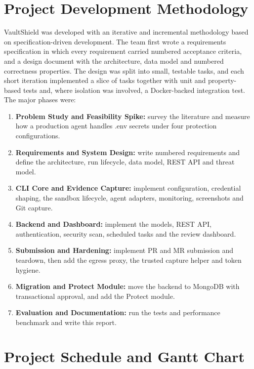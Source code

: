 \documentclass[12pt,a4paper,oneside]{report}
\providecommand{\tightlist}{\setlength{\itemsep}{0pt}\setlength{\parskip}{0pt}}
\begin{document}
\section{Project Development Methodology}\label{project-development-methodology}

VaultShield was developed with an iterative and incremental methodology based on specification-driven development. The team first wrote a requirements specification in which every requirement carried numbered acceptance criteria, and a design document with the architecture, data model and numbered correctness properties. The design was split into small, testable tasks, and each short iteration implemented a slice of tasks together with unit and property-based tests and, where isolation was involved, a Docker-backed integration test. The major phases were:

\begin{enumerate}
\tightlist
\item
  \textbf{Problem Study and Feasibility Spike:} survey the literature and measure how a production agent handles .env secrets under four protection configurations.
\item
  \textbf{Requirements and System Design:} write numbered requirements and define the architecture, run lifecycle, data model, REST API and threat model.
\item
  \textbf{CLI Core and Evidence Capture:} implement configuration, credential shaping, the sandbox lifecycle, agent adapters, monitoring, screenshots and Git capture.
\item
  \textbf{Backend and Dashboard:} implement the models, REST API, authentication, security scan, scheduled tasks and the review dashboard.
\item
  \textbf{Submission and Hardening:} implement PR and MR submission and teardown, then add the egress proxy, the trusted capture helper and token hygiene.
\item
  \textbf{Migration and Protect Module:} move the backend to MongoDB with transactional approval, and add the Protect module.
\item
  \textbf{Evaluation and Documentation:} run the tests and performance benchmark and write this report.
\end{enumerate}

\section{Project Schedule and Gantt Chart}\label{project-schedule}
\end{document}
